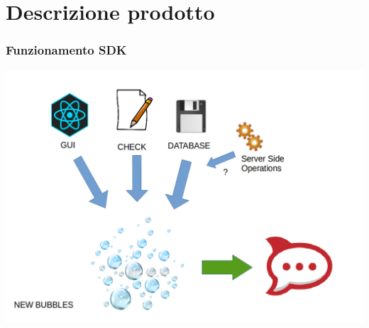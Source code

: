 \section{Descrizione prodotto}




\begin{frame}
	\frametitle{Funzionamento SDK}
\begin{center}
	\includegraphics[width=\linewidth,height=.8\textheight,keepaspectratio]{img/uso_sdk.png}
\end{center}
\end{frame}
